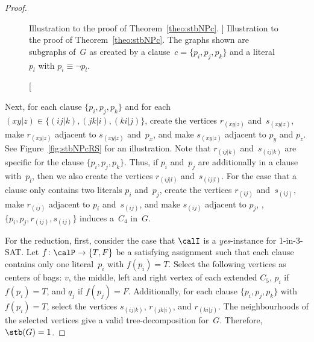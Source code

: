 \begin{proof}
\begin{figure}
    \caption
    [%
        Illustration to the proof of Theorem~\ref{theo:stbNPc}.
    ]
    {%
        Illustration to the proof of Theorem~\ref{theo:stbNPc}.
        The graphs shown are subgraphs of~$G$ as created by a clause~$c = \{ p_i, p_j, p_k \}$ and a literal~$p_l$ with $p_i \equiv \neg p_l$.
    }
    \label{fig:stbNPc_full}
\end{figure}

Next, for each clause $\{ p_i, p_j, p_k \}$ and for each $(xy|z) \in \big \{ (ij|k), (jk|i), (ki|j) \big \}$, create the vertices $r_{(xy|z)}$ and~$s_{(xy|z)}$, make $r_{(xy|z)}$ adjacent to $s_{(xy|z)}$ and~$p_x$, and make $s_{(xy|z)}$ adjacent to $p_y$ and $p_z$.
See Figure~\ref{fig:stbNPcRS} for an illustration.
Note that $r_{(ij|k)}$ and~$s_{(ij|k)}$ are specific for the clause $\{ p_i, p_j, p_k \}$.
Thus, if $p_i$ and~$p_j$ are additionally in a clause with~$p_l$, then we also create the vertices $r_{(ij|l)}$ and~$s_{(ij|l)}$.
For the case that a clause only contains two literals $p_i$ and~$p_j$, create the vertices $r_{(ij)}$ and~$s_{(ij)}$, make $r_{(ij)}$ adjacent to $p_i$ and~$s_{(ij)}$, and make $s_{(ij)}$ adjacent to $p_j$, \ie, $\{ p_i, p_j, r_{(ij)}, s_{(ij)} \}$ induces a~$C_4$ in~$G$.


For the reduction, first, consider the case that $\calI$ is a \emph{yes}-instance for 1-in-3-SAT.
Let $f \colon \calP \rightarrow \{ T, F \}$ be a satisfying assignment such that each clause contains only one literal~$p_i$ with $f(p_i) = T$.
Select the following vertices as centers of bags: $v$, the middle, left and right vertex of each extended $C_5$, $p_i$ if $f(p_i) = T$, and $q_j$ if $f(p_j) = F$.
Additionally, for each clause $\{ p_i, p_j, p_k \}$ with $f(p_i) = T$, select the vertices $s_{(ij|k)}$, $r_{(jk|i)}$, and $r_{(ki|j)}$.
The neighbourhoods of the selected vertices give a valid tree-decomposition for~$G$.
Therefore, $\stb(G) = 1$.



\end{proof}
